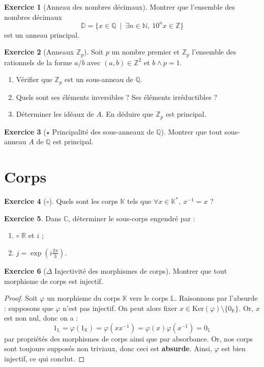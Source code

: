 \documentclass[french]{book}
\newcommand{\N}{\mathbb{N}}
\newcommand{\Z}{\mathbb{Z}}
\newcommand{\Q}{\mathbb{Q}}
\newcommand{\R}{\mathbb{R}}
\newcommand{\C}{\mathbb{C}}
\newcommand{\K}{\mathbb{K}}
\renewcommand{\L}{\mathbb{L}}
\newcommand{\st}{^*}
\newcommand{\inv}{^{-1}}
\renewcommand{\ker}{\text{Ker}}
\theoremstyle{definition}
\newtheorem{ex}{Exercice}[chapter]
\theoremstyle{theorem}
\theoremstyle{remark}
\begin{document}
\begin{ex}[Anneau des nombres décimaux]
	Montrer que l'ensemble des nombres décimaux $$\mathbb{D}=\{x\in\Q\ \mid \ \exists n\in\N,\ 10^nx\in\Z\}$$ est un anneau principal.
\end{ex}

\begin{ex}[Anneaux $\Z_p$]
	Soit $p$ un nombre premier et $\Z_p$ l'ensemble des rationnels de la forme $a/b$ avec $(a,b)\in\Z^2$ et $b\wedge p=1$.
	\begin{enumerate}
		\item Vérifier que $\Z_p$ est un sous-anneau de $\Q$.
		\item Quels sont ses éléments inversibles ? Ses éléments irréductibles ?
		\item Déterminer les idéaux de $A$. En déduire que $\Z_p$ est principal.
	\end{enumerate}
\end{ex}

\begin{ex}[$\star$ Principalité des sous-anneaux de $\Q$]
	Montrer que tout sous-anneau $A$ de $\Q$ est principal.
\end{ex}

\section{Corps}

\begin{ex}[$\circ$]
	Quels sont les corps $\K$ tels que $\forall x\in\K\st,\ x\inv=x$ ?
\end{ex}

\begin{ex}
	Dans $\C$, déterminer le sous-corps engendré par :
	\begin{enumerate}
		\item $\circ$ $\R$ et $i$ ;
		\item $j=\exp\displaystyle\left(i\frac{2\pi}{3}\right)$.
	\end{enumerate}
\end{ex}

\begin{ex}[$\Delta$ Injectivité des morphismes de corps]
	Montrer que tout morphisme de corps est injectif.
\end{ex}

\begin{proof}
	Soit $\varphi$ un morphisme du corps $\K$ vers le corps $\L$. Raisonnons par l'absurde : supposons que $\varphi$ n'est pas injectif. On peut alors fixer $x \in \ker(\varphi) \setminus \{0_\K\}$. Or, $x$ est non nul, donc on a : $$1_\L=\varphi(1_\K)=\varphi(xx\inv)=\varphi(x)\varphi(x\inv)=0_\L$$ par propriétés des morphismes de corps ainsi que par absorbance. Or, nos corps sont toujours supposés non triviaux, donc ceci est \textbf{absurde}. Ainsi, $\varphi$ est bien injectif, ce qui conclut.
\end{proof}
\end{document}
